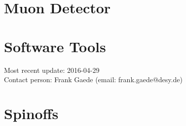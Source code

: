 \documentclass[10pt,final]{report}
\begin{document}
\chapter{Muon Detector}




\chapter{Software Tools}
Most recent update: 2016-04-29\\
Contact person: Frank Gaede (email: frank.gaede@desy.de)







% 
\chapter{Spinoffs}

\printbibliography
\end{document}
